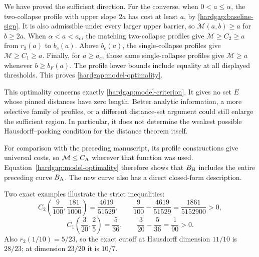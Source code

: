 We have proved the sufficient direction. For the converse, when
\(0<a\le\alpha\), the two-collapse profile with upper slope \(2a\)
has cost at least \(a\), by \eqref{hardgap:baseline-sign}.
It is also admissible under every larger upper barrier, so
\(\mathcal M(a,b)\ge a\) for \(b\ge2a\).
When \(\alpha<a<a_c\), the matching two-collapse profiles give
\(\mathcal M\ge C_2\ge a\) from \(r_2(a)\) to \(b_c(a)\).
Above \(b_c(a)\), the single-collapse profiles give
\(\mathcal M\ge C_1\ge a\). Finally, for \(a\ge a_c\), those
same single-collapse profiles give \(\mathcal M\ge a\) whenever
\(b\ge b_F(a)\). The profile lower bounds include equality at all
displayed thresholds. This proves \eqref{hardgap:model-optimality}.

This optimality concerns exactly \eqref{hardgap:model-criterion}.
It gives no set \(E\) whose pinned distances have zero length.
Better analytic information, a more selective family of profiles, or a
different distance-set argument could still enlarge the sufficient region.
In particular, it does not determine the weakest possible Hausdorff--packing
condition for the distance theorem itself.

For comparison with the preceding manuscript, its profile constructions
give universal costs, so \(\mathcal M\le C_{\rm A}\) wherever that
function was used. Equation~\eqref{hardgap:model-optimality} therefore
shows that \(B_{\rm H}\) includes the entire preceding curve
\(B_{\rm A}\). The new curve also has a direct closed-form description.

Two exact examples illustrate the strict inequalities:
\[
 C_2\left(\frac9{100},\frac{181}{1000}\right)=\frac{4619}{51529},
 \qquad\frac9{100}-\frac{4619}{51529}=\frac{1861}{5152900}>0,
\]
\[
 C_1\left(\frac3{20},\frac25\right)=\frac5{36},
 \qquad\frac3{20}-\frac5{36}=\frac1{90}>0.
\]
Also \(r_2(1/10)=5/23\), so the exact cutoff at Hausdorff dimension
\(11/10\) is \(28/23\); at dimension \(23/20\) it is \(10/7\).
